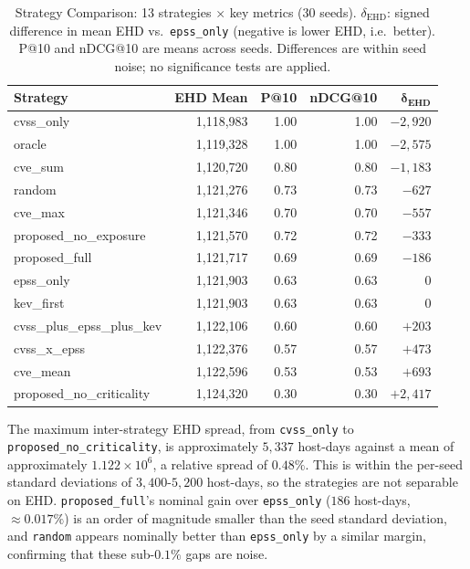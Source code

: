 \documentclass[journal]{IEEEtran}
\begin{document}
\begin{table}[t]
\caption{Strategy Comparison: 13 strategies $\times$ key metrics
         (30 seeds). $\delta_{\text{EHD}}$: signed difference in
         mean EHD vs.\ \texttt{epss\_only} (negative is lower
         EHD, i.e.\ better). P@10 and nDCG@10 are means across
         seeds. Differences are within seed noise; no
         significance tests are applied.}
\label{tab:strategy_comparison}
\centering
\footnotesize
\setlength{\tabcolsep}{4pt}
\begin{tabular}{@{}lrrrr@{}}
\toprule
\textbf{Strategy} & \textbf{EHD Mean} &
  \textbf{P@10} & \textbf{nDCG@10} &
  $\boldsymbol{\delta_{\text{EHD}}}$ \\
\midrule
cvss\_only               & 1{,}118{,}983 & 1.00 & 1.00 & $-2{,}920$ \\
oracle                   & 1{,}119{,}328 & 1.00 & 1.00 & $-2{,}575$ \\
cve\_sum                 & 1{,}120{,}720 & 0.80 & 0.80 & $-1{,}183$ \\
random                   & 1{,}121{,}276 & 0.73 & 0.73 & $-627$ \\
cve\_max                 & 1{,}121{,}346 & 0.70 & 0.70 & $-557$ \\
proposed\_no\_exposure   & 1{,}121{,}570 & 0.72 & 0.72 & $-333$ \\
proposed\_full           & 1{,}121{,}717 & 0.69 & 0.69 & $-186$ \\
epss\_only               & 1{,}121{,}903 & 0.63 & 0.63 & $0$ \\
kev\_first               & 1{,}121{,}903 & 0.63 & 0.63 & $0$ \\
cvss\_plus\_epss\_plus\_kev & 1{,}122{,}106 & 0.60 & 0.60 & $+203$ \\
cvss\_x\_epss            & 1{,}122{,}376 & 0.57 & 0.57 & $+473$ \\
cve\_mean                & 1{,}122{,}596 & 0.53 & 0.53 & $+693$ \\
proposed\_no\_criticality & 1{,}124{,}320 & 0.30 & 0.30 & $+2{,}417$ \\
\bottomrule
\end{tabular}
\end{table}

The maximum inter-strategy EHD spread, from \texttt{cvss\_only}
to \texttt{proposed\_no\_criticality}, is approximately
$5{,}337$ host-days against a mean of approximately
$1.122 \times 10^6$, a relative spread of $0.48\%$.  This is
within the per-seed standard deviations of $3{,}400$-$5{,}200$
host-days, so the strategies are not separable on EHD.
\texttt{proposed\_full}'s nominal gain over \texttt{epss\_only}
($186$ host-days, $\approx 0.017\%$) is an order of magnitude
smaller than the seed standard deviation, and \texttt{random}
appears nominally better than \texttt{epss\_only} by a similar
margin, confirming that these sub-$0.1\%$ gaps are noise.
\end{document}
